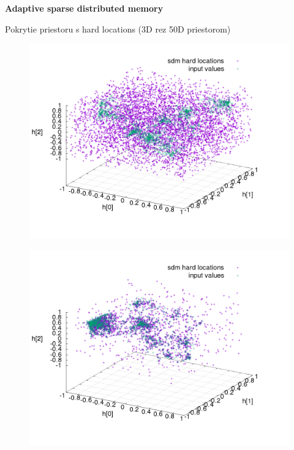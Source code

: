 \documentclass[xcolor=dvipsnames]{beamer}
\begin{document}
\begin{frame}{\bf Adaptive sparse distributed memory}

Pokrytie priestoru s hard locations (3D rez 50D priestorom)

\begin{minipage}{.5\textwidth}

\begin{figure}[!htb]
\includegraphics[scale=.25]{../pictures/sdm_hard_locations_all_original.png}
\label{img:oroginal_sdm}
\end{figure}


\end{minipage}%
\begin{minipage}{.5\textwidth}

\begin{figure}[!htb]
\includegraphics[scale=.25]{../pictures/sdm_hard_locations_all_new.png}
\label{img:adaptive_sdm}
\end{figure}


\end{minipage}

\end{frame}
\end{document}

